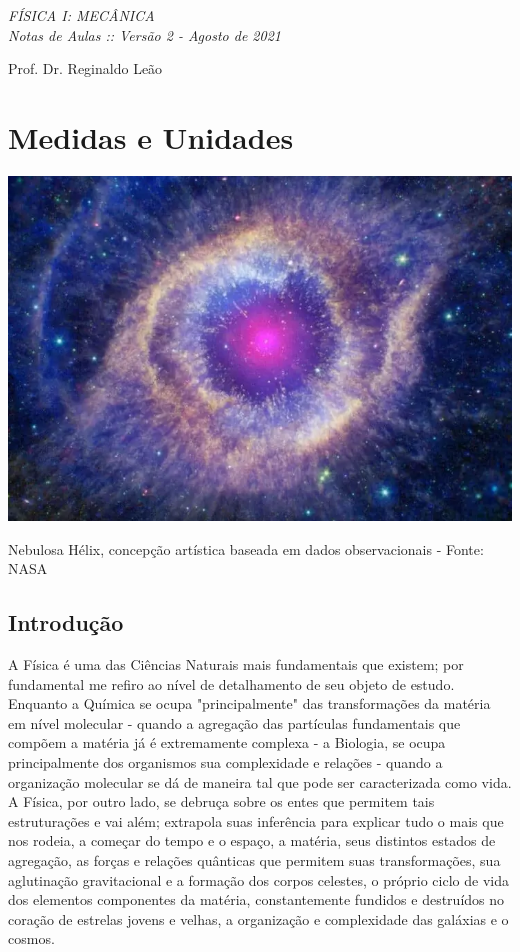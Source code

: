 \documentclass[a4paper, 11pt]{report}
\begin{document}

{\noindent
\slshape\Huge\MakeUppercase{FÍSICA I: Mecânica \\} 
Notas de Aulas :: {Versão 2 - Agosto de 2021} \par
\vskip0.3in
\noindent\large{Prof. Dr. Reginaldo Leão} \\
}\date{\today}

\chapter{Medidas e Unidades}
\begin{center}
    \includegraphics[scale=.4]{img/nebhelix.png}

    {\footnotesize Nebulosa Hélix, concepção artística baseada em dados 
    observacionais - Fonte: NASA}
\end{center}

\section{Introdução}
A Física é uma das Ciências Naturais mais fundamentais que existem; por 
fundamental me refiro ao nível de detalhamento de seu objeto de estudo. Enquanto 
a Química se ocupa "principalmente" das transformações da matéria em nível 
molecular  - quando a agregação das partículas fundamentais que compõem 
a matéria já é extremamente complexa - a Biologia, se ocupa principalmente dos 
organismos sua complexidade e relações - quando a organização molecular se dá 
de maneira tal que pode ser caracterizada como vida. A Física, por outro lado, se
debruça sobre os entes que permitem tais estruturações e vai além; extrapola 
suas inferência para explicar tudo o mais que nos rodeia, a começar do tempo e o
espaço, a matéria, seus distintos estados de agregação, as forças e relações 
quânticas que permitem suas transformações, sua aglutinação gravitacional e a 
formação dos corpos celestes, o próprio ciclo de vida dos elementos componentes
da matéria, constantemente fundidos e destruídos no coração de estrelas jovens e 
velhas, a organização e complexidade das galáxias e o cosmos.
\end{document}
